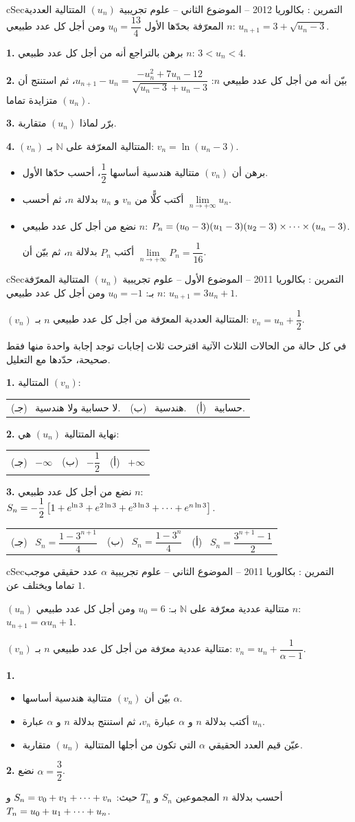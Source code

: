 \documentclass[12pt,a4paper]{article}
\newenvironment{BOX}[2]{\begin{otherlanguage}{english}\begin{arbox}{#1}{#2}}{\end{arbox}\end{otherlanguage}}
\newcounter{exo}
\newenvironment{tamrin}[1]{\stepcounter{exo}\begin{BOX}{cSec}{التمرين \theexo: #1}}{\end{BOX}}
\renewcommand{\cdots}{\mathinner{\cdotp\cdotp\cdotp}}
\newcommand{\N}{\mathbb{N}}
\newenvironment{sq}{\begin{itemize}[leftmargin=2.4em,itemsep=3pt]}{\end{itemize}}
\newcommand{\qa}{\item[(أ)]}\newcommand{\qb}{\item[(ب)]}\newcommand{\qc}{\item[(جـ)]}\newcommand{\qd}{\item[(د)]}\newcommand{\qe}{\item[(هـ)]}
\newcommand{\QQ}[1]{\par\smallskip\textbf{#1.} }
\newcommand{\ABC}[3]{\\[2pt]\begin{tabular}{p{0.28\textwidth}p{0.28\textwidth}p{0.28\textwidth}}(جـ) \ #3 & (ب) \ #2 & (أ) \ #1\end{tabular}}
\begin{document}
\begin{tamrin}{بكالوريا 2012 -- الموضوع الثاني -- علوم تجريبية}
$(u_n)$ المتتالية العددية المعرّفة بحدّها الأول $u_0=\dfrac{13}{4}$ ومن أجل كل عدد طبيعي $n$: $u_{n+1}=3+\sqrt{u_n-3}$.
\QQ{1} برهن بالتراجع أنه من أجل كل عدد طبيعي $n$: $3<u_n<4$.
\QQ{2} بيّن أنه من أجل كل عدد طبيعي $n$: $u_{n+1}-u_n=\dfrac{-u_n^2+7u_n-12}{\sqrt{u_n-3}+u_n-3}$، ثم استنتج أن $(u_n)$ متزايدة تماما.
\QQ{3} برّر لماذا $(u_n)$ متقاربة.
\QQ{4} $(v_n)$ المتتالية المعرّفة على $\N$ بـ: $v_n=\ln\left(u_n-3\right)$.
\begin{sq}
\qa برهن أن $(v_n)$ متتالية هندسية أساسها $\dfrac{1}{2}$، أحسب حدّها الأول.
\qb أكتب كلًّا من $v_n$ و $u_n$ بدلالة $n$، ثم أحسب $\lim\limits_{n\to+\infty}u_n$.
\qc نضع من أجل كل عدد طبيعي $n$: $P_n=(u_0-3)(u_1-3)(u_2-3)\times\cdots\times(u_n-3)$.

أكتب $P_n$ بدلالة $n$، ثم بيّن أن $\lim\limits_{n\to+\infty}P_n=\dfrac{1}{16}$.
\end{sq}
\end{tamrin}

\begin{tamrin}{بكالوريا 2011 -- الموضوع الأول -- علوم تجريبية}
$(u_n)$ المتتالية المعرّفة بـ: $u_0=-1$ ومن أجل كل عدد طبيعي $n$: $u_{n+1}=3u_n+1$.

$(v_n)$ المتتالية العددية المعرّفة من أجل كل عدد طبيعي $n$ بـ: $v_n=u_n+\dfrac{1}{2}$.

في كل حالة من الحالات الثلاث الآتية اقترحت ثلاث إجابات توجد إجابة واحدة منها فقط صحيحة، حدّدها مع التعليل.
\QQ{1} المتتالية $(v_n)$:
\ABC{حسابية.}{هندسية.}{لا حسابية ولا هندسية.}
\QQ{2} نهاية المتتالية $(u_n)$ هي:
\ABC{$+\infty$}{$-\dfrac{1}{2}$}{$-\infty$}
\QQ{3} نضع من أجل كل عدد طبيعي $n$: $S_n=-\dfrac{1}{2}\left[1+e^{\ln 3}+e^{2\ln 3}+e^{3\ln 3}+\cdots+e^{n\ln 3}\right]$.
\ABC{$S_n=\dfrac{3^{n+1}-1}{2}$}{$S_n=\dfrac{1-3^n}{4}$}{$S_n=\dfrac{1-3^{n+1}}{4}$}
\end{tamrin}

\begin{tamrin}{بكالوريا 2011 -- الموضوع الثاني -- علوم تجريبية}
$\alpha$ عدد حقيقي موجب تماما ويختلف عن $1$.

$(u_n)$ متتالية عددية معرّفة على $\N$ بـ: $u_0=6$ ومن أجل كل عدد طبيعي $n$: $u_{n+1}=\alpha u_n+1$.

$(v_n)$ متتالية عددية معرّفة من أجل كل عدد طبيعي $n$ بـ: $v_n=u_n+\dfrac{1}{\alpha-1}$.
\QQ{1}
\begin{sq}
\qa بيّن أن $(v_n)$ متتالية هندسية أساسها $\alpha$.
\qb أكتب بدلالة $n$ و $\alpha$ عبارة $v_n$، ثم استنتج بدلالة $n$ و $\alpha$ عبارة $u_n$.
\qc عيّن قيم العدد الحقيقي $\alpha$ التي تكون من أجلها المتتالية $(u_n)$ متقاربة.
\end{sq}
\QQ{2} نضع $\alpha=\dfrac{3}{2}$.

أحسب بدلالة $n$ المجموعين $S_n$ و $T_n$ حيث: $S_n=v_0+v_1+\cdots+v_n$ و $T_n=u_0+u_1+\cdots+u_n$.
\end{tamrin}
\end{document}
